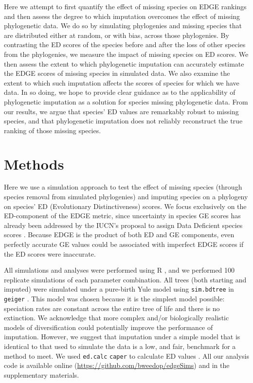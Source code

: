 \documentclass[12pt,english]{article}
\begin{document}
Here we attempt to first quantify the effect of missing species on EDGE rankings and
then assess the degree to which imputation overcomes the effect of missing
phylogenetic data. We do so by simulating phylogenies and missing species that are distributed
either at random, or with bias, across those phylogenies.
By contrasting the ED scores of the species before and after the loss of other species from the phylogenies, we measure the impact of missing species on ED scores. We then assess the extent
to which phylogenetic imputation can accurately estimate the EDGE scores of
missing species in simulated data. We also examine the extent to which such imputation affects
the scores of species for which we have data. In so doing, we hope to provide clear guidance as to the
applicability of phylogenetic imputation as a solution for species missing
phylogenetic data. From our results, we argue that species' ED values are
remarkably robust to missing species, and that phylogenetic imputation does not
reliably reconstruct the true ranking of those missing species.

\section*{Methods}

Here we use a simulation approach to test the effect of missing species (through
species removal from simulated phylogenies) and imputing species on a phylogeny
on species' ED (Evolutionary Distinctiveness) scores. We focus exclusively on
the ED-component of the EDGE metric, since uncertainty in species GE scores has
already been addressed by the IUCN's proposal to assign Data Deficient species
scores \autocite{Iucn2001, Iucn2008}. Because EDGE is the product of both ED and
GE components, even perfectly accurate GE values could
be associated with imperfect EDGE scores if the ED scores were inaccurate.


All simulations and analyses were performed using R \autocite[version
3.4.0;][]{R2017}, and we performed 100 replicate simulations of each parameter
combination. All trees (both starting and imputed) were simulated under a
pure-birth Yule model using 
\texttt{sim.bdtree} in \texttt{geiger} \autocite[setting parameters \texttt{b=1} and \texttt{d=0};][]{Pennell2014}. This model was
chosen because it is the simplest model possible: speciation rates are constant
across the entire tree of life and there is no extinction. We acknowledge that
more complex and/or biologically realistic models of diversification could
potentially improve the performance of imputation. However, we suggest that
imputation under a simple model that is identical to that used to simulate the
data is a low, and fair, benchmark for a method to meet. We used
\texttt{ed.calc} \texttt{caper} to calculate ED values
\autocite{Orme2013}. All our analysis code is available online (\url{https://github.com/bweedop/edgeSims})
and in the supplementary materials.
\end{document}
